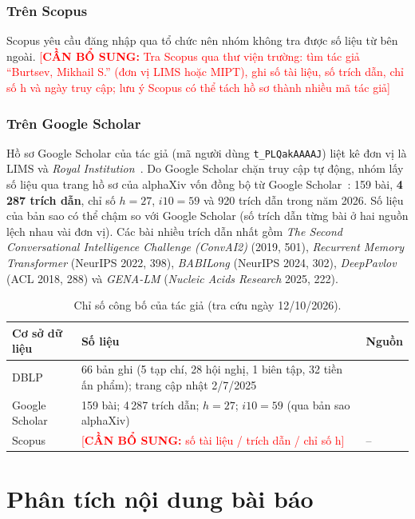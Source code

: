 \documentclass[12pt,a4paper,openany]{report}
\numberwithin{equation}{chapter}   %
\theoremstyle{definition}
\newif\ifdraft \drafttrue          %
\newcommand{\todo}[1]{\ifdraft\textcolor{red}{[\textbf{CẦN BỔ SUNG:} #1]}\fi}
\newcommand{\en}[1]{\textit{#1}}   %
\begin{document}
\subsection{Trên Scopus}
Scopus yêu cầu đăng nhập qua tổ chức nên nhóm không tra được số liệu từ bên ngoài. 
\todo{Tra Scopus qua thư viện trường: tìm tác giả ``Burtsev, Mikhail S.'' (đơn vị LIMS hoặc MIPT), ghi số tài liệu, số trích dẫn, chỉ số h và ngày truy cập; lưu ý Scopus có thể tách hồ sơ thành nhiều mã tác giả}

\subsection{Trên Google Scholar}
Hồ sơ Google Scholar của tác giả (mã người dùng \texttt{t\_PLQakAAAAJ}) liệt kê đơn vị là LIMS và \en{Royal Institution}~\cite{scholarprofile}. Do Google Scholar chặn truy cập tự động, nhóm lấy số liệu qua trang hồ sơ của alphaXiv vốn đồng bộ từ Google Scholar~\cite{alphaxiv}: 159 bài, \textbf{4\,287 trích dẫn}, chỉ số $h=27$, $i10=59$ và 920 trích dẫn trong năm 2026. Số liệu của bản sao có thể chậm so với Google Scholar (số trích dẫn từng bài ở hai nguồn lệch nhau vài đơn vị). Các bài nhiều trích dẫn nhất gồm \en{The Second Conversational Intelligence Challenge (ConvAI2)} (2019, 501), \en{Recurrent Memory Transformer} (NeurIPS 2022, 398), \en{BABILong} (NeurIPS 2024, 302), \en{DeepPavlov} (ACL 2018, 288) và \en{GENA-LM} (\en{Nucleic Acids Research} 2025, 222).

\begin{table}[ht]
\centering
\caption{Chỉ số công bố của tác giả (tra cứu ngày 12/10/2026).}\label{tab:tacgia}
\begin{tabular}{@{}p{3.2cm}p{7.4cm}p{3.2cm}@{}}
\toprule
\textbf{Cơ sở dữ liệu} & \textbf{Số liệu} & \textbf{Nguồn}\\
\midrule
DBLP & 66 bản ghi (5 tạp chí, 28 hội nghị, 1 biên tập, 32 tiền ấn phẩm); trang cập nhật 2/7/2025 & \cite{dblp}\\
Google Scholar & 159 bài; 4\,287 trích dẫn; $h=27$; $i10=59$ (qua bản sao alphaXiv) & \cite{alphaxiv}\\
Scopus & \todo{số tài liệu / trích dẫn / chỉ số h} & --\\
\bottomrule
\end{tabular}
\end{table}

\chapter{Phân tích nội dung bài báo}\label{ch:phantich}
\end{document}
